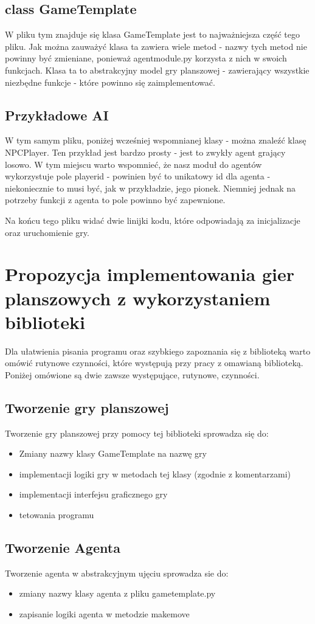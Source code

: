 \documentclass[declaration,shortabstract,inz]{iithesis}
\begin{document}
\subsection{class GameTemplate}
W pliku tym znajduje się klasa GameTemplate jest to najważniejsza część tego pliku.
Jak można zauważyć klasa ta zawiera wiele metod - nazwy tych metod nie powinny być zmieniane, ponieważ agent\textunderscore module.py korzysta z nich w swoich funkcjach.
Klasa ta to abstrakcyjny model gry planszowej - zawierający wszystkie niezbędne funkcje - które powinno się zaimplementować.
\subsection{Przykładowe AI}
W tym samym pliku, poniżej wcześniej wspomnianej klasy - można znaleźć klasę NPCPlayer. Ten przykład jest bardzo prosty - jest to zwykły agent grający losowo.
W tym miejscu warto wspomnieć, że nasz moduł do agentów wykorzystuje pole player\textunderscore id - powinien być to unikatowy id dla agenta - niekoniecznie to musi być, jak w przykładzie, jego pionek.
Niemniej jednak na potrzeby funkcji z agenta to pole powinno być zapewnione.

Na końcu tego pliku widać dwie linijki kodu, które odpowiadają za inicjalizacje oraz uruchomienie gry.
\section{Propozycja implementowania gier planszowych z wykorzystaniem biblioteki}
Dla ułatwienia pisania programu oraz szybkiego zapoznania się z biblioteką warto omówić rutynowe czynności, które występują przy pracy z omawianą biblioteką.
Poniżej omówione są dwie zawsze występujące, rutynowe, czynności.
\subsection{Tworzenie gry planszowej}
Tworzenie gry planszowej przy pomocy tej biblioteki sprowadza się do:
\begin{itemize}
  \item Zmiany nazwy klasy GameTemplate na nazwę gry
  \item implementacji logiki gry w metodach tej klasy (zgodnie z komentarzami)
  \item implementacji interfejsu graficznego gry
  \item tetowania programu
\end{itemize}

\subsection{Tworzenie Agenta}
Tworzenie agenta w abstrakcyjnym ujęciu sprowadza sie do:
\begin{itemize}
  \item zmiany nazwy klasy agenta z pliku game\textunderscore template.py
  \item zapisanie logiki agenta w metodzie make\textunderscore move
\end{itemize}
\end{document}
